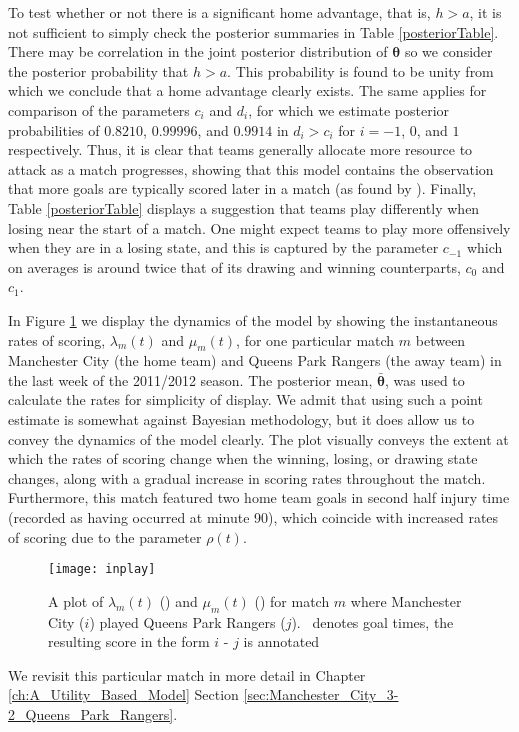 To test whether or not there is a significant home advantage, that is, \(h > a\), it is not sufficient to simply check
the posterior summaries in Table \ref{posteriorTable}. There may be correlation in the joint posterior distribution of
\(\boldsymbol{\theta}\) so we consider the posterior probability that \(h > a\). This probability is found to be unity
from which we conclude that a home advantage clearly exists. The same applies for comparison of the parameters \(c_i\)
and \(d_i\), for which we estimate posterior probabilities of \(0.8210\), \(0.99996\), and \(0.9914\) in \(d_i > c_i\)
for \(i = -1\), \(0\), and \(1\) respectively. Thus, it is clear that teams generally allocate more resource to attack
as a match progresses, showing that this model contains the observation that more goals are typically scored later in a
match (as found by \cite{DixonRobinson1998}). Finally, Table \ref{posteriorTable} displays a suggestion that teams play
differently when losing near the start of a match. One might expect teams to play more offensively when they are in a
losing state, and this is captured by the parameter \(c_{-1}\) which on averages is around twice that of its
drawing and winning counterparts, \(c_0\) and \(c_1\).

In Figure \ref{inplay} we display the dynamics of the model by showing the instantaneous rates of scoring,
\(\lambda_m(t)\) and \(\mu_m(t)\), for one particular match  \(m\) between Manchester City (the home team) and Queens
Park Rangers (the away team) in the last week of the 2011/2012 season. The posterior mean,
\(\boldsymbol{\bar{\theta}}\), was used to calculate the rates for simplicity of display. We admit that using such a
point estimate is somewhat against Bayesian methodology, but it does allow us to convey the dynamics of the model
clearly. The plot visually conveys the extent at which the rates of scoring change when the winning, losing, or drawing
state changes, along with a gradual increase in scoring rates throughout the match. Furthermore, this match featured two
home team goals in second half injury time (recorded as having occurred at minute 90), which coincide with increased
rates of scoring due to the parameter \(\rho(t)\).
\begin{figure}[htp]
\begin{center}
\texttt{[image: inplay]}
\caption{A plot of \(\lambda_m(t)\) (\protect\redSolidLine) and \(\mu_m(t)\) (\protect\blueDashedLine) for match
\(m\) where Manchester City (\(i\)) played Queens Park Rangers (\(j\)). \protect\graySolidLine\ denotes goal times, the
resulting score in the form \(i\) - \(j\) is annotated}
\label{inplay}
\end{center}
\end{figure}
We revisit this particular match in more detail in Chapter \ref{ch:A_Utility_Based_Model} Section
\ref{sec:Manchester_City_3-2_Queens_Park_Rangers}.

